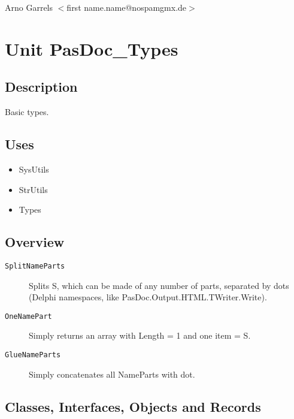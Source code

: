 \documentclass{report}
\newif\ifpdf
\begin{document}
\par
Arno Garrels {$<$}first name.name@nospamgmx.de{$>$}

\chapter{Unit PasDoc{\_}Types}
\label{PasDoc_Types}
\section{Description}
Basic types.\hfill\vspace*{1ex}

   
\section{Uses}
\begin{itemize}
\item \begin{ttfamily}SysUtils\end{ttfamily}\item \begin{ttfamily}StrUtils\end{ttfamily}\item \begin{ttfamily}Types\end{ttfamily}\end{itemize}
\section{Overview}
\begin{description}
\item[\texttt{\begin{ttfamily}EPasDoc\end{ttfamily} Class}]
\end{description}
\begin{description}
\item[\texttt{SplitNameParts}]Splits S, which can be made of any number of parts, separated by dots (Delphi namespaces, like PasDoc.Output.HTML.TWriter.Write).
\item[\texttt{OneNamePart}]Simply returns an array with Length = 1 and one item = S.
\item[\texttt{GlueNameParts}]Simply concatenates all NameParts with dot.
\end{description}
\section{Classes, Interfaces, Objects and Records}
\ifpdf
\end{document}
